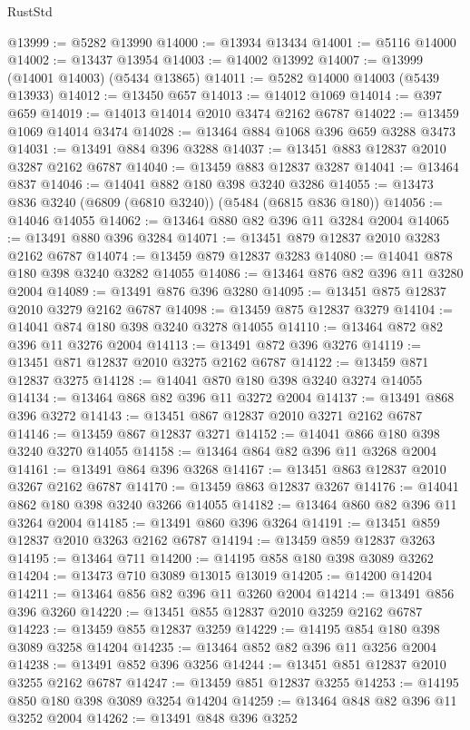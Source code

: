 \begin{lexlean}{RustStd}
\begin{coremodule}
{\begin{coremodule}
{{{{{{{{{{{{{{{{{{{{{{{{{{{{{{{@13999 := @5282 @13990
@14000 := @13934 @13434
@14001 := @5116 @14000
@14002 := @13437 @13954
@14003 := @14002 @13992
@14007 := @13999 (@14001 @14003) (@5434 @13865)
@14011 := @5282 @14000 @14003 (@5439 @13933)
@14012 := @13450 @657
@14013 := @14012 @1069
@14014 := @397 @659
@14019 := @14013 @14014 @2010 @3474 @2162 @6787
@14022 := @13459 @1069 @14014 @3474
@14028 := @13464 @884 @1068 @396 @659 @3288 @3473
@14031 := @13491 @884 @396 @3288
@14037 := @13451 @883 @12837 @2010 @3287 @2162 @6787
@14040 := @13459 @883 @12837 @3287
@14041 := @13464 @837
@14046 := @14041 @882 @180 @398 @3240 @3286
@14055 := @13473 @836 @3240 (@6809 (@6810 @3240)) (@5484 (@6815 @836 @180))
@14056 := @14046 @14055
@14062 := @13464 @880 @82 @396 @11 @3284 @2004
@14065 := @13491 @880 @396 @3284
@14071 := @13451 @879 @12837 @2010 @3283 @2162 @6787
@14074 := @13459 @879 @12837 @3283
@14080 := @14041 @878 @180 @398 @3240 @3282 @14055
@14086 := @13464 @876 @82 @396 @11 @3280 @2004
@14089 := @13491 @876 @396 @3280
@14095 := @13451 @875 @12837 @2010 @3279 @2162 @6787
@14098 := @13459 @875 @12837 @3279
@14104 := @14041 @874 @180 @398 @3240 @3278 @14055
@14110 := @13464 @872 @82 @396 @11 @3276 @2004
@14113 := @13491 @872 @396 @3276
@14119 := @13451 @871 @12837 @2010 @3275 @2162 @6787
@14122 := @13459 @871 @12837 @3275
@14128 := @14041 @870 @180 @398 @3240 @3274 @14055
@14134 := @13464 @868 @82 @396 @11 @3272 @2004
@14137 := @13491 @868 @396 @3272
@14143 := @13451 @867 @12837 @2010 @3271 @2162 @6787
@14146 := @13459 @867 @12837 @3271
@14152 := @14041 @866 @180 @398 @3240 @3270 @14055
@14158 := @13464 @864 @82 @396 @11 @3268 @2004
@14161 := @13491 @864 @396 @3268
@14167 := @13451 @863 @12837 @2010 @3267 @2162 @6787
@14170 := @13459 @863 @12837 @3267
@14176 := @14041 @862 @180 @398 @3240 @3266 @14055
@14182 := @13464 @860 @82 @396 @11 @3264 @2004
@14185 := @13491 @860 @396 @3264
@14191 := @13451 @859 @12837 @2010 @3263 @2162 @6787
@14194 := @13459 @859 @12837 @3263
@14195 := @13464 @711
@14200 := @14195 @858 @180 @398 @3089 @3262
@14204 := @13473 @710 @3089 @13015 @13019
@14205 := @14200 @14204
@14211 := @13464 @856 @82 @396 @11 @3260 @2004
@14214 := @13491 @856 @396 @3260
@14220 := @13451 @855 @12837 @2010 @3259 @2162 @6787
@14223 := @13459 @855 @12837 @3259
@14229 := @14195 @854 @180 @398 @3089 @3258 @14204
@14235 := @13464 @852 @82 @396 @11 @3256 @2004
@14238 := @13491 @852 @396 @3256
@14244 := @13451 @851 @12837 @2010 @3255 @2162 @6787
@14247 := @13459 @851 @12837 @3255
@14253 := @14195 @850 @180 @398 @3089 @3254 @14204
@14259 := @13464 @848 @82 @396 @11 @3252 @2004
@14262 := @13491 @848 @396 @3252
}}}}}}}}}}}}}}}}}}}}}}}}}}}}}}}
\end{coremodule}}
\end{coremodule}
\end{lexlean}
